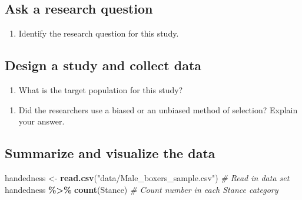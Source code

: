 \documentclass[
]{report}
\newenvironment{Shaded}{\begin{snugshade}}{\end{snugshade}}
\newcommand{\CommentTok}[1]{\textcolor[rgb]{0.56,0.35,0.01}{\textit{#1}}}
\newcommand{\KeywordTok}[1]{\textcolor[rgb]{0.13,0.29,0.53}{\textbf{#1}}}
\newcommand{\NormalTok}[1]{#1}
\newcommand{\OperatorTok}[1]{\textcolor[rgb]{0.81,0.36,0.00}{\textbf{#1}}}
\newcommand{\StringTok}[1]{\textcolor[rgb]{0.31,0.60,0.02}{#1}}
\providecommand{\tightlist}{%
  \setlength{\itemsep}{0pt}\setlength{\parskip}{0pt}}
\begin{document}
\vspace{0.5in}

\hypertarget{ask-a-research-question}{%
\subsection*{Ask a research question}\label{ask-a-research-question}}

\begin{enumerate}
\def\labelenumi{\arabic{enumi}.}
\setcounter{enumi}{4}
\tightlist
\item
  Identify the research question for this study.
\end{enumerate}

\vspace{1in}

\hypertarget{design-a-study-and-collect-data}{%
\subsection*{Design a study and collect data}\label{design-a-study-and-collect-data}}

\begin{enumerate}
\def\labelenumi{\arabic{enumi}.}
\setcounter{enumi}{5}
\tightlist
\item
  What is the target population for this study?
\end{enumerate}

\vspace{0.5in}

\begin{enumerate}
\def\labelenumi{\arabic{enumi}.}
\setcounter{enumi}{6}
\tightlist
\item
  Did the researchers use a biased or an unbiased method of selection? Explain your answer.
\end{enumerate}

\vspace{1in}

\hypertarget{summarize-and-visualize-the-data}{%
\subsection*{Summarize and visualize the data}\label{summarize-and-visualize-the-data}}

\begin{Shaded}
\begin{Highlighting}[]
\NormalTok{handedness \textless{}{-}}\StringTok{ }\KeywordTok{read.csv}\NormalTok{(}\StringTok{"data/Male\_boxers\_sample.csv"}\NormalTok{) }\CommentTok{\# Read in data set}
\NormalTok{handedness }\OperatorTok{\%\textgreater{}\%}\StringTok{ }\KeywordTok{count}\NormalTok{(Stance)  }\CommentTok{\# Count number in each Stance category}
\end{Highlighting}
\end{Shaded}
\end{document}
